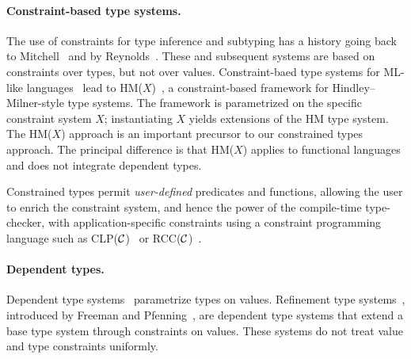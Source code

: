 \newcommand\hmx{HM($X$)\xspace}


\paragraph{Constraint-based type systems.}

The use of constraints for type inference and subtyping has a history
going back to Mitchell~\cite{mitchell84} and by
Reynolds~\cite{reynolds85}.  These and subsequent systems
are based on
constraints over types, but not over values.
Constraint-baed type systems for ML-like
languages~\cite{trifonov96,pottier96simplifying}
lead to \hmx~\cite{sulzmann97type}, a constraint-based framework for
Hindley--Milner-style type systems.
The framework is parametrized on
the specific constraint system $X$; instantiating $X$ yields
extensions of the HM type system.  
The \hmx{} approach is an important precursor to
our constrained types approach. The principal difference is that
\hmx{} applies to functional languages and does not integrate
dependent types.

Constrained types permit {\em user-defined}
predicates and functions, allowing the user to enrich
the constraint system, and hence the power of the compile-time type-checker,
with application-specific constraints using a constraint
programming language such as CLP($\cal C$)~\cite{clp} or 
RCC($\cal C$)~\cite{DBLP:conf/fsttcs/JagadeesanNS05}.

\paragraph{Dependent types.}

Dependent type
systems~\cite{xi99dependent,calc-constructions,epigram,cayenne}
param\-etrize types on values.  Refinement type
systems~\cite{refinement-types,conditional-types,jones94,sized-types,flanagan-popl06,flanagan-fool06,liquid-types},
introduced by Freeman and Pfenning~\cite{refinement-types}, are dependent type
systems that extend a base type system through constraints on values.  These
systems do not treat value and type constraints uniformly.

